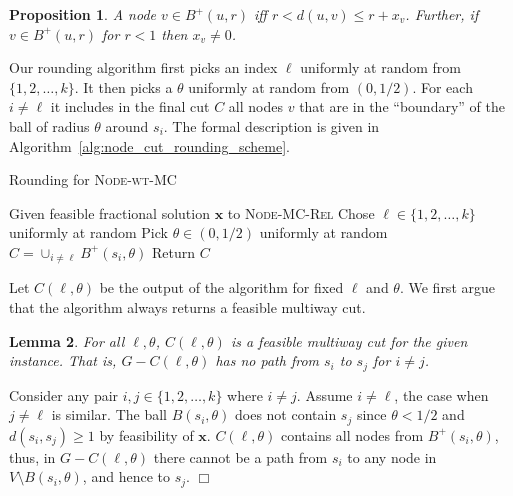 \documentclass[11pt]{article}
\newtheorem{lemma}{Lemma}[section]
\newtheorem{prop}[lemma]{Proposition}
\renewenvironment{proof}{\vspace{-0.1in}\noindent{\bf Proof:}}{\hspace*{\fill}$\Box$\par}
\def\bx{\textbf{x}}
\def\NodeMC{\textsc{Node-wt-MC}\xspace}
\def\NodeMC{\textsc{Node-wt-MC}\xspace}
\def\NodeMCRel{\textsc{Node-MC-Rel}\xspace}
\begin{document}
\begin{prop}
  \label{prop:node-boundary}
  A node $v \in B^+(u,r)$ iff $r < d(u,v) \le r + x_v$. Further, 
  if $v \in B^+(u,r)$ for $r < 1$ then $x_v \neq 0$.
\end{prop}

Our rounding algorithm first picks an index $\ell$ uniformly at random
from $\{1,2,\ldots,k\}$. It then picks a $\theta$ uniformly at random
from $(0,1/2)$. For each $i \neq \ell$ it includes in the final cut $C$
all nodes $v$ that are in the ``boundary'' of the ball of radius
$\theta$ around $s_i$.  The formal description is given in
Algorithm~\ref{alg:node_cut_rounding_scheme}.

\begin{algorithm}[htb]
	\caption{Rounding for \NodeMC}
	\label{alg:node_cut_rounding_scheme}
	\begin{algorithmic}[1]
		\STATE Given feasible fractional solution $\bx$ to \NodeMCRel
		\STATE Chose $\ell \in \{1,2,\dots,k\}$ uniformly at random
\STATE Pick $\theta \in (0,1/2)$ uniformly at random
\STATE $C = \cup_{i \neq \ell} B^+(s_i,\theta)$
		\STATE Return $C$
	\end{algorithmic}
\end{algorithm}

Let $C(\ell,\theta)$ be the output of the algorithm for fixed $\ell$
and $\theta$.  We first argue that the algorithm always returns a
feasible multiway cut.
\begin{lemma}
For all $\ell,\theta$, $C(\ell,\theta)$ 
is a feasible multiway cut for the given instance. That is, $G - C(\ell,\theta)$
has no path from $s_i$ to $s_j$ for $i \neq j$.
\end{lemma}
\begin{proof}
  Consider any pair $i,j \in \{1,2,\ldots,k\}$ where $i \neq j$.
  Assume $i \neq \ell$, the case when $j \neq \ell$ is similar.
  The ball $B(s_i,\theta)$ does not contain $s_j$ since 
  $\theta < 1/2$ and $d(s_i,s_j) \ge 1$ by feasibility of $\bx$.
  $C(\ell,\theta)$ contains all nodes from $B^+(s_i,\theta)$, thus, in  $G-C(\ell,\theta)$ there
  cannot be a path from $s_i$ to any node in $V \setminus B(s_i,\theta)$,
  and hence to $s_j$.
\end{proof}
\end{document}
